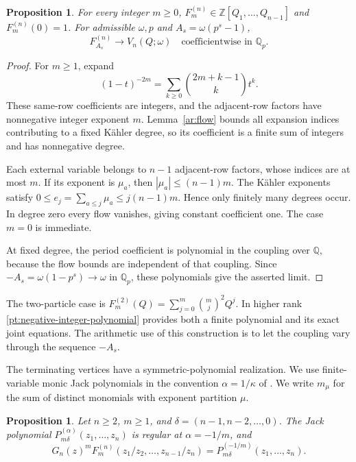 \documentclass[11pt]{amsart}
\newtheorem{proposition}[theorem]{Proposition}
\theoremstyle{definition}
\theoremstyle{remark}
\numberwithin{equation}{section}
\newcommand{\Z}{\mathbb Z}
\newcommand{\Q}{\mathbb Q}
\begin{document}
\begin{proposition}\label{pt:polynomiality}
For every integer $m\geq0$,
$F_m^{(n)}\in\Z[Q_1,\ldots,Q_{n-1}]$ and $F_m^{(n)}(0)=1$.
For admissible $\omega,p$ and $A_s=\omega(p^s-1)$,
\[
 F_{A_s}^{(n)}\longrightarrow V_n(Q;\omega)
 \quad\text{coefficientwise in }\Q_p.
\]
\end{proposition}

\begin{proof}
For $m\geq1$, expand
\[
 (1-t)^{-2m}=\sum_{k\geq0}\binom{2m+k-1}{k}t^k.
\]
These same-row coefficients are integers, and the adjacent-row
factors have nonnegative integer exponent $m$.
Lemma~\ref{ar:flow} bounds all expansion indices contributing to
a fixed K\"ahler degree, so its coefficient is a finite sum of
integers and has nonnegative degree.

Each external variable belongs to $n-1$ adjacent-row factors,
whose indices are at most $m$. If its exponent is $\mu_a$,
then $|\mu_a|\leq(n-1)m$. The K\"ahler exponents satisfy
$0\leq e_j=\sum_{a\leq j}\mu_a\leq j(n-1)m$.
Hence only finitely many degrees occur. In degree zero every
flow vanishes, giving constant coefficient one. The case $m=0$
is immediate.

At fixed degree, the period coefficient is polynomial in the
coupling over $\Q$, because the flow bounds are independent of
that coupling. Since $-A_s=\omega(1-p^s)\to\omega$ in
$\Q_p$, these polynomials give the asserted limit.
\end{proof}

The two-particle case is
$F_m^{(2)}(Q)=\sum_{j=0}^m\binom mj^2Q^j$.
In higher rank \eqref{pt:negative-integer-polynomial} provides
both a finite polynomial and its exact joint equations. The
arithmetic use of this construction is to let the coupling vary
through the sequence $-A_s$.

The terminating vertices have a symmetric-polynomial realization.
We use finite-variable monic Jack polynomials in the convention
$\alpha=1/\kappa$ of \cite{Mac95,NS13}. We write $m_\mu$
for the sum of distinct monomials with exponent partition $\mu$.

\begin{proposition}\label{pt:jack-realization}
Let $n\geq2$, $m\geq1$, and
$\delta=(n-1,n-2,\ldots,0)$. The Jack polynomial
$P_{m\delta}^{(\alpha)}(z_1,\ldots,z_n)$ is regular at
$\alpha=-1/m$, and
\begin{equation}\label{pt:jack-specialization}
 G_n(z)^m F_m^{(n)}(z_1/z_2,\ldots,z_{n-1}/z_n)
 =P_{m\delta}^{(-1/m)}(z_1,\ldots,z_n).
\end{equation}
\end{proposition}
\end{document}
